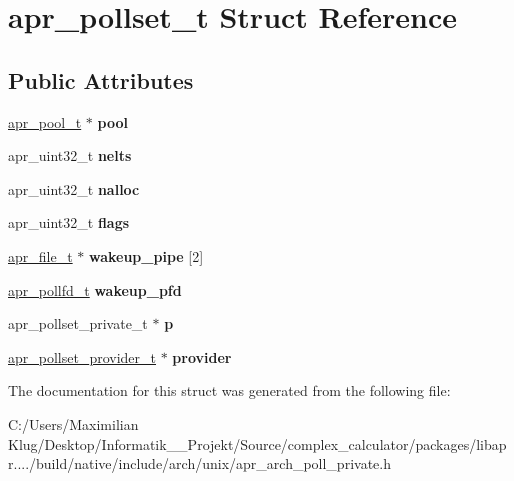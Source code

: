 \hypertarget{structapr__pollset__t}{}\section{apr\+\_\+pollset\+\_\+t Struct Reference}
\label{structapr__pollset__t}
\subsection*{Public Attributes}
\begin{DoxyCompactItemize}
\item 
\mbox{\label{structapr__pollset__t_a9db4fc11d206be3d5577613f95659c1c}} 
\mbox{\hyperlink{group__apr__pools_gaf137f28edcf9a086cd6bc36c20d7cdfb}{apr\+\_\+pool\+\_\+t}} $\ast$ {\bfseries pool}
\item 
\mbox{\label{structapr__pollset__t_afa5ce82ebfc480df8a2002c5072b4c71}} 
apr\+\_\+uint32\+\_\+t {\bfseries nelts}
\item 
\mbox{\label{structapr__pollset__t_a107c3285970d13930688710dc22cefc4}} 
apr\+\_\+uint32\+\_\+t {\bfseries nalloc}
\item 
\mbox{\label{structapr__pollset__t_a7c5a54ea97e85835914486a1fed9ea90}} 
apr\+\_\+uint32\+\_\+t {\bfseries flags}
\item 
\mbox{\label{structapr__pollset__t_a21a78faacdf6e329c9333220a3b69307}} 
\mbox{\hyperlink{structapr__file__t}{apr\+\_\+file\+\_\+t}} $\ast$ {\bfseries wakeup\+\_\+pipe} \mbox{[}2\mbox{]}
\item 
\mbox{\label{structapr__pollset__t_ab7f6b91ff333eeb4911ab41c44d3344a}} 
\mbox{\hyperlink{structapr__pollfd__t}{apr\+\_\+pollfd\+\_\+t}} {\bfseries wakeup\+\_\+pfd}
\item 
\mbox{\label{structapr__pollset__t_a3f8411536cd6a23826a9cebf1328dddf}} 
apr\+\_\+pollset\+\_\+private\+\_\+t $\ast$ {\bfseries p}
\item 
\mbox{\label{structapr__pollset__t_a35d0be26b8169926ed3eb2313078ef35}} 
\mbox{\hyperlink{structapr__pollset__provider__t}{apr\+\_\+pollset\+\_\+provider\+\_\+t}} $\ast$ {\bfseries provider}
\end{DoxyCompactItemize}


The documentation for this struct was generated from the following file\+:\begin{DoxyCompactItemize}
\item 
C\+:/\+Users/\+Maximilian Klug/\+Desktop/\+Informatik\+\_\+\_\+\+Projekt/\+Source/complex\+\_\+calculator/packages/libapr..../build/native/include/arch/unix/apr\+\_\+arch\+\_\+poll\+\_\+private.\+h\end{DoxyCompactItemize}

